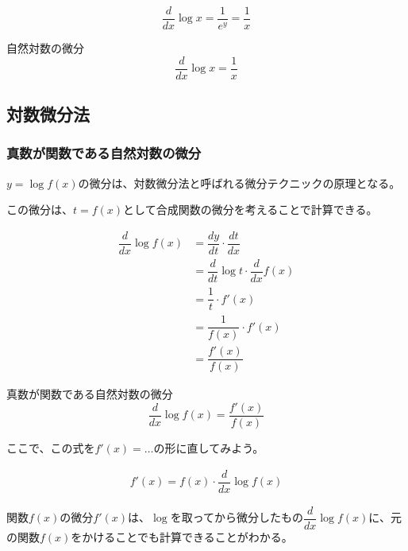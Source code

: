 \documentclass[../math-imaging]{subfiles}
\begin{document}
\begin{equation}
  \dfrac{d}{dx}\log x = \dfrac{1}{e^y} = \dfrac{1}{x}
\end{equation}

\begin{theorem}{自然対数の微分}
  \LARGE
  \begin{equation}
    \dfrac{d}{dx}\log x = \dfrac{1}{x}
  \end{equation}
\end{theorem}

\subsection{対数微分法}

\subsubsection{真数が関数である自然対数の微分}

$y=\log f(x)$の微分は、対数微分法と呼ばれる微分テクニックの原理となる。

この微分は、$t=f(x)$として合成関数の微分を考えることで計算できる。

\begin{align}
  \dfrac{d}{dx}\log f(x) & = \dfrac{dy}{dt} \cdot \dfrac{dt}{dx}         \\
                         & = \dfrac{d}{dt}\log t \cdot \dfrac{d}{dx}f(x) \\
                         & = \dfrac{1}{t} \cdot f'(x)                    \\
                         & = \dfrac{1}{f(x)} \cdot f'(x)                 \\
                         & = \dfrac{f'(x)}{f(x)}
\end{align}

\begin{theorem}{真数が関数である自然対数の微分}
  \LARGE
  \begin{equation}
    \dfrac{d}{dx}\log f(x) = \dfrac{f'(x)}{f(x)}
  \end{equation}
\end{theorem}

ここで、この式を$f'(x) = \ldots$の形に直してみよう。

\begin{align}
  f'(x) = f(x) \cdot \dfrac{d}{dx}\log f(x)
\end{align}

関数$f(x)$の微分$f'(x)$は、$\log$を取ってから微分したもの$\dfrac{d}{dx}\log f(x)$に、元の関数$f(x)$をかけることでも計算できることがわかる。
\end{document}
